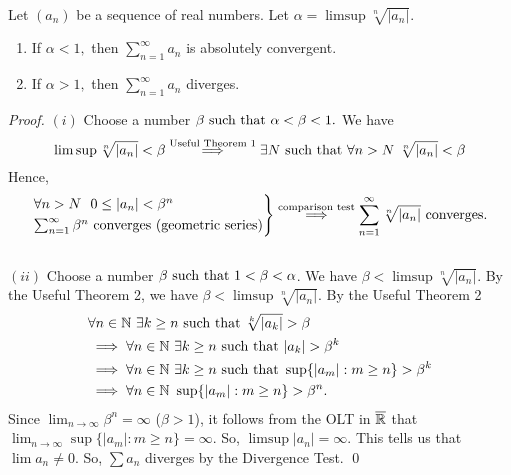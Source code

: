 \begin{theorem}  \leavevmode \\
    \label{thm3.33}
    Let $(a_n)$ be a sequence of real numbers. Let $\alpha = \limsup \sqrt[n]{|a_n|}$.
    \begin{enumerate}[$(i)$]
        \item If $\alpha < 1,$ then $\sum_{n=1}^{\infty}a_n$ is absolutely convergent.
        \item If $\alpha > 1,$ then $\sum_{n=1}^{\infty}a_n$ diverges.
    \end{enumerate}    
\end{theorem}
\begin{proof} \leavevmode
    $(i)$ Choose a number $\beta \text{ such that } \alpha < \beta < 1.$ We have
    $$\limsup \sqrt[n]{|a_n|} < \beta \overset{\text{Useful Theorem 1}}{\implies} \exists N \text{ such that } \forall n > N ~\sqrt[n]{|a_n|} < \beta$$
    Hence,
    $$
    \begin{rcases*}
        \forall n > N ~~0 \leq |a_n| < \beta ^n \\
        \sum_{n=1}^{\infty}\beta ^n \text{ converges (geometric series)}
    \end{rcases*}
    \overset{\text{comparison test}}{\implies} \sum_{n=1}^{\infty}\sqrt[n]{|a_n|} \text{ converges.}$$
    \\
    $(ii)$ Choose a number $\beta \text{ such that } 1 < \beta < \alpha$. We have $\beta < \limsup \sqrt[n]{|a_n|}.$ By the Useful Theorem 2, we have $\beta < \limsup \sqrt[n]{|a_n|}.$ By the Useful Theorem 2
    \begin{align*}
        &\forall n \in \mathbb{N} ~\exists k \geq n \text{ such that } \sqrt[k]{|a_k|} > \beta \\
        &\implies \forall n \in \mathbb{N} ~\exists k \geq n \text{ such that } |a_k| > \beta ^k \\
        &\implies \forall n \in \mathbb{N} ~\exists k \geq n \text{ such that } \sup \{|a_m| : m \geq n\} > \beta ^ k \\
        &\implies \forall n \in \mathbb{N} ~\sup \{|a_m| : m \geq n\} > \beta ^n.
    \end{align*}
    Since $\lim_{n \to \infty}\beta ^n = \infty$ ($\beta > 1$), it follows from the OLT in $\overline{\mathbb{R}}$ that $\lim_{n\to \infty} \sup\{|a_m| : m \geq n\} = \infty$. So, $\limsup|a_n| = \infty.$ This tells us that $\lim a_n \not = 0$. So, $\sum a_n $ diverges by the Divergence Test. \qed
\end{proof}

